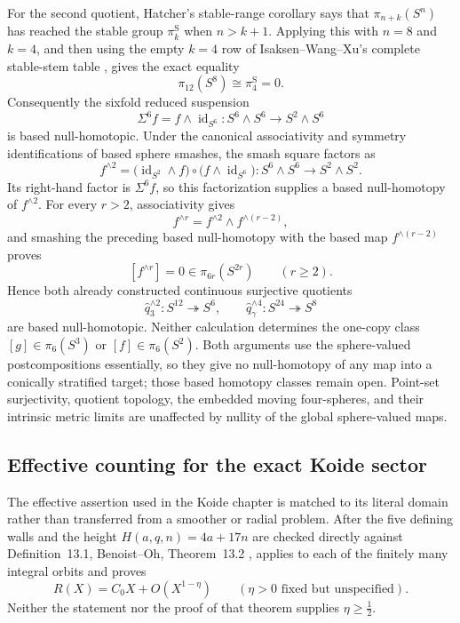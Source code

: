 For the second quotient, Hatcher's stable-range corollary
\cite[Corollary~4.24, p.~360]{Hatcher2002} says that
\(\pi_{n+k}(S^n)\) has reached the stable group \(\pi_k^{\mathrm S}\)
when \(n>k+1\).  Applying this with \(n=8\) and \(k=4\), and then using
the empty \(k=4\) row of Isaksen--Wang--Xu's complete stable-stem table
\cite[Table~1, p.~113]{IsaksenWangXu2023}, gives the exact equality
\[
 \pi_{12}(S^8)\cong\pi_4^{\mathrm S}=0.
\]
Consequently the sixfold reduced suspension
\[
 \Sigma^6f=f\wedge\operatorname{id}_{S^6}:
 S^6\wedge S^6\longrightarrow S^2\wedge S^6
\]
is based null-homotopic.  Under the canonical associativity and symmetry
identifications of based sphere smashes, the smash square factors as
\[
 f^{\wedge2}
 =\bigl(\operatorname{id}_{S^2}\wedge f\bigr)
  \circ\bigl(f\wedge\operatorname{id}_{S^6}\bigr):
 S^6\wedge S^6\longrightarrow S^2\wedge S^2.
\]
Its right-hand factor is \(\Sigma^6f\), so this factorization supplies a
based null-homotopy of \(f^{\wedge2}\).  For every \(r>2\), associativity
gives
\[
 f^{\wedge r}=f^{\wedge2}\wedge f^{\wedge(r-2)},
\]
and smashing the preceding based null-homotopy with the based map
\(f^{\wedge(r-2)}\) proves
\[
 [f^{\wedge r}]=0\in\pi_{6r}(S^{2r})
 \qquad(r\geq2).
\]
Hence both already constructed continuous surjective quotients
\[
 \widehat q_3^{\wedge2}:S^{12}\twoheadrightarrow S^6,
 \qquad
 \widehat q_\gamma^{\wedge4}:S^{24}\twoheadrightarrow S^8
\]
are based null-homotopic.  Neither calculation determines the one-copy
class \([g]\in\pi_6(S^3)\) or \([f]\in\pi_6(S^2)\).  Both arguments use
the sphere-valued postcompositions essentially, so they give no
null-homotopy of any map into a conically stratified target; those based
homotopy classes remain open.  Point-set surjectivity, quotient topology,
the embedded moving four-spheres, and their intrinsic metric limits are
unaffected by nullity of the global sphere-valued maps.

\subsection{Effective counting for the exact Koide sector}

The effective assertion used in the Koide chapter is matched to its literal
domain rather than transferred from a smoother or radial problem.  After the
five defining walls and the height \(H(a,q,n)=4a+17n\) are checked directly
against Definition~13.1, Benoist--Oh, Theorem~13.2
\cite{BenoistOh_2012}, applies to each of the finitely many integral orbits
and proves
\[
 R(X)=C_0X+O(X^{1-\eta})
 \qquad(\eta>0\text{ fixed but unspecified}).
\]
Neither the statement nor the proof of that theorem supplies
\(\eta\geq\tfrac12\).

